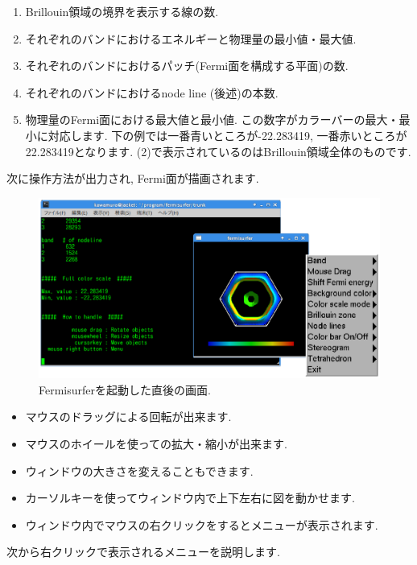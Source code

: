 \documentclass[12pt]{jarticle}
\begin{document}
\begin{enumerate}
  \renewcommand{\labelenumi}{(\arabic{enumi})}
  \item Brillouin領域の境界を表示する線の数.
  \item それぞれのバンドにおけるエネルギーと物理量の最小値・最大値.
  \item それぞれのバンドにおけるパッチ(Fermi面を構成する平面)の数.
  \item それぞれのバンドにおけるnode line (後述)の本数.
  \item 物理量のFermi面における最大値と最小値.
    この数字がカラーバーの最大・最小に対応します. 
    下の例では一番青いところが-22.283419, 一番赤いところが22.283419となります.
    (2)で表示されているのはBrillouin領域全体のものです.    
\end{enumerate}

次に操作方法が出力され, Fermi面が描画されます. 

\begin{figure}[!ht]
  \includegraphics[width=17cm]{figs/start.eps}
  \caption{Fermisurferを起動した直後の画面.}
  \label{fig_start}
\end{figure}

\begin{itemize}
\item マウスのドラッグによる回転が出来ます. 
\item マウスのホイールを使っての拡大・縮小が出来ます. 
\item ウィンドウの大きさを変えることもできます. 
\item カーソルキーを使ってウィンドウ内で上下左右に図を動かせます. 
\item ウィンドウ内でマウスの右クリックをするとメニューが表示されます. 
\end{itemize}

次から右クリックで表示されるメニューを説明します. 
\end{document}
